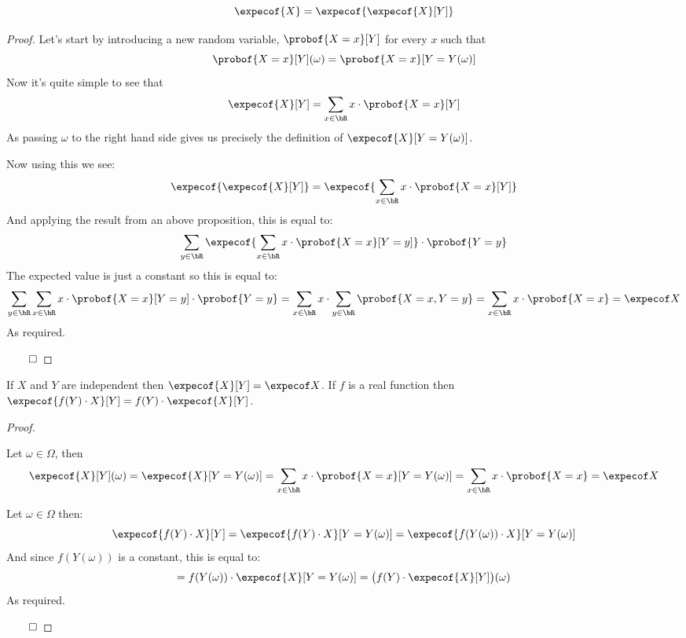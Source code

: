 \begin{thrm*}

	\[ \expecof{X} = \expecof{\expecof{X}[Y]} \]

\end{thrm*}

\begin{proof}

	Let's start by introducing a new random variable, $\probof{X=x}[Y]$ for every $x$  such that
	\[ \probof{X=x}[Y](\omega)=\probof{X=x}[Y=Y(\omega)] \]
	Now it's quite simple to see that
	\[ \expecof{X}[Y] = \sum_{x\in\bR}x\cdot\probof{X=x}[Y] \]
	As passing $\omega$ to the right hand side gives us precisely the definition of $\expecof{X}[Y=Y(\omega)]$.

	Now using this we see:
	\[ \expecof{\expecof{X}[Y]} = \expecof{\sum_{x\in\bR}x\cdot\probof{X=x}[Y]} \]
	And applying the result from an above proposition, this is equal to:
	\[ \sum_{y\in\bR}\expecof{\sum_{x\in\bR}x\cdot\probof{X=x}[Y=y]}\cdot\probof{Y=y} \]
	The expected value is just a constant so this is equal to:
	\[ \sum_{y\in\bR}\sum_{x\in\bR}x\cdot\probof{X=x}[Y=y]\cdot\probof{Y=y} = \sum_{x\in\bR}x\cdot\sum_{y\in\bR}\probof{X=x,Y=y}
	= \sum_{x\in\bR}x\cdot\probof{X=x} = \expecof X\]
	As required.

	\hfill$\qed$

\end{proof}

\begin{prop*}[condExpecProp]

	\begin{msecenumerate}[0pt]
		\mitem If $X$ and $Y$ are independent then $\expecof{X}[Y]=\expecof X$.
		\mitem If $f$ is a real function then $\expecof{f(Y)\cdot X}[Y]=f(Y)\cdot\expecof{X}[Y]$.
	\end{msecenumerate}

\end{prop*}

\begin{proof}

	\begin{msecenumerate}[0pt]
		\mitem Let $\omega\in\Omega$, then
			\[ \expecof{X}[Y](\omega) = \expecof{X}[Y=Y(\omega)] = \sum_{x\in\bR}x\cdot\probof{X=x}[Y=Y(\omega)] =
			\sum_{x\in\bR}x\cdot\probof{X=x} = \expecof X \]

		\mitem Let $\omega\in\Omega$ then:
			\[ \expecof{f(Y)\cdot X}[Y] = \expecof{f(Y)\cdot X}[Y=Y(\omega)] = \expecof{f(Y(\omega))\cdot X}[Y=Y(\omega)] \]
			And since $f(Y(\omega))$ is a constant, this is equal to:
			\[ = f(Y(\omega)) \cdot \expecof{X}[Y=Y(\omega)] = \big(f(Y)\cdot\expecof{X}[Y]\big)(\omega) \]
			As required.
	\end{msecenumerate}

	\hfill$\qed$

\end{proof}

